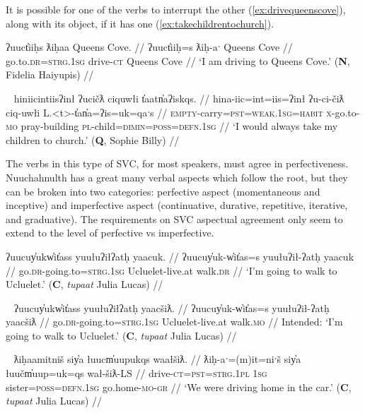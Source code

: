 It is possible for one of the verbs to interrupt the other (\ref{ex:drivequeenscove}), along with its object, if it has one (\ref{ex:takechildrentochurch}).

\ex \label{ex:drivequeenscove}
\begingl
\glpreamble ʔuuct̓iiḥs ƛiḥaa Queens Cove. //
\gla ʔuuct̓iiḥ=s ƛiḥ-aˑ Queens Cove //
\glb go.to.\textsc{dr}=\textsc{strg.1sg} drive-\textsc{ct} Queens Cove //
\glft `I am driving to Queens Cove.' (\textbf{N}, Fidelia Haiyupis) //
\endgl
\xe

\ex~ \label{ex:takechildrentochurch}
\begingl
\glpreamble hiniicintiisʔinł ʔucičƛ ciquwłi t̓aatn̓aʔiskqs. //
\gla hina-iic=int=iis=ʔinł ʔu-ci-čiƛ ciq-uwłi L.<t>-t̓an̓a=ʔis=uk=qaˑs  //
\glb \textsc{empty}-carry=\textsc{pst}=\textsc{weak.1sg}=\textsc{habit} \textsc{x}-go.to-\textsc{mo} pray-building \textsc{pl}-child=\textsc{dimin}=\textsc{poss}=\textsc{defn.1sg} //
\glft `I would always take my children to church.' (\textbf{Q}, Sophie Billy) //
\endgl
\xe

The verbs in this type of SVC, for most speakers, must agree in perfectiveness. Nuuchahnulth has a great many verbal aspects which follow the root, but they can be broken into two categories: perfective aspect (momentaneous and inceptive) and imperfective aspect (continuative, durative, repetitive, iterative, and graduative). The requirements on SVC aspectual agreement only seem to extend to the level of perfective vs imperfective.

\ex \label{ex:goingtoucluelet}
\begingl
\glpreamble ʔuucuy̓ukw̓it̓ass yuułuʔiłʔatḥ yaacuk. //
\gla ʔuucuy̓uk-w̓it̓as=s yuułuʔił-ʔatḥ yaacuk //
\glb go.\textsc{dr}-going.to=\textsc{strg.1sg} Ucluelet-live.at walk.\textsc{dr} //
\glft `I'm going to walk to Ucluelet.' (\textbf{C}, \textit{tupaat} Julia Lucas) //
\endgl
\xe

\ex~ \label{ex:*goingtoucluelet}
\begingl
\glpreamble *ʔuucuy̓ukw̓it̓ass yuułuʔiłʔatḥ yaacšiƛ. //
\gla ʔuucuy̓uk-w̓it̓as=s yuułuʔił-ʔatḥ yaacšiƛ //
\glb go.\textsc{dr}-going.to=\textsc{strg.1sg} Ucluelet-live.at walk.\textsc{mo} //
\glft Intended: `I'm going to walk to Ucluelet.' (\textbf{C}, \textit{tupaat} Julia Lucas) //
\endgl
\xe

\ex~ \label{ex:drivehome}
\begingl
\glpreamble ƛiḥaamitniš siy̓a łuucm̓uupukqs waałšiƛ. //
\gla ƛiḥ-aˑ=(m)it=niˑš siy̓a łuučm̓uup=uk=qs wał-šiƛ-LS //
\glb drive-\textsc{ct}=\textsc{pst}=\textsc{strg.1pl} \textsc{1sg} sister=\textsc{poss}=\textsc{defn.1sg} go.home-\textsc{mo}-\textsc{gr} //
\glft `We were driving home in the car.' (\textbf{C}, \textit{tupaat} Julia Lucas) //
\endgl
\xe

